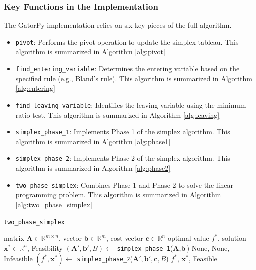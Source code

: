 \documentclass[conference]{IEEEtran}
\begin{document}
\subsubsection{Key Functions in the Implementation}
The GatorPy implementation relies on six key pieces of the full algorithm.
\begin{itemize}
    \item \texttt{pivot}: Performs the pivot operation to update the simplex tableau.
    This algorithm is summarized in Algorithm \ref{alg:pivot}
    \item \texttt{find\_entering\_variable}: Determines the entering variable based on the specified rule (e.g., Bland's rule).
    This algorithm is summarized in Algorithm \ref{alg:entering}
    \item \texttt{find\_leaving\_variable}: Identifies the leaving variable using the minimum ratio test.
    This algorithm is summarized in Algorithm \ref{alg:leaving}
    \item \texttt{simplex\_phase\_1}: Implements Phase 1 of the simplex algorithm.
    This algorithm is summarized in Algorithm \ref{alg:phase1}
    \item \texttt{simplex\_phase\_2}: Implements Phase 2 of the simplex algorithm.
    This algorithm is summarized in Algorithm \ref{alg:phase2}
    \item \texttt{two\_phase\_simplex}: Combines Phase 1 and Phase 2 to solve the linear programming problem.
    This algorithm is summarized in Algorithm \ref{alg:two_phase_simplex}
\end{itemize}

\begin{algorithm}
    \caption{\texttt{two\_phase\_simplex}}
    \label{alg:two_phase_simplex}
    \begin{algorithmic}[1]
    \Require matrix $\textbf{A} \in \mathbb{R}^{m \times n}$, vector $\textbf{b} \in \mathbb{R}^{m}$, cost vector $\textbf{c} \in \mathbb{R}^{n}$
    \Ensure optimal value $f^*$, solution $\textbf{x}^* \in \mathbb{R}^n$, Feasibility
    \State $(\textbf{A}', \textbf{b}', B) \gets$ \texttt{simplex\_phase\_1}($\textbf{A}, \textbf{b}$)
        \State \Return None, None, Infeasible
    \EndIf
    \State $(f^*, \textbf{x}^*) \gets$ \texttt{simplex\_phase\_2}($\textbf{A}', \textbf{b}', \textbf{c}, B$)
    \State \Return $f^*$, $\textbf{x}^*$, Feasible
    \end{algorithmic}
\end{algorithm}
    
\end{document}
